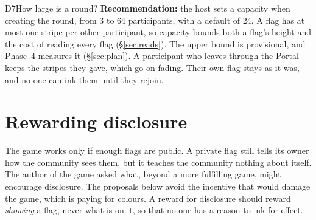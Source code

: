 \documentclass[11pt,a4paper]{article}
\begin{document}
\begin{decision}{D7}{How large is a round?}
\textbf{Recommendation:} the host sets a capacity when creating the round, from 3 to 64
participants, with a default of 24. A flag has at most one stripe per other participant, so
capacity bounds both a flag's height and the cost of reading every flag
(\S\ref{sec:reads}). The upper bound is provisional, and Phase~4 measures it
(\S\ref{sec:plan}). A participant who leaves through the Portal keeps the stripes they gave,
which go on fading. Their own flag stays as it was, and no one can ink them until they rejoin.
\end{decision}

\section{Rewarding disclosure}\label{sec:incentives}

The game works only if enough flags are public. A private flag still tells its owner how the
community sees them, but it teaches the community nothing about itself. The author of the game
asked what, beyond a more fulfilling game, might encourage disclosure. The proposals below avoid
the incentive that would damage the game, which is paying for colours. A reward for disclosure
should reward \emph{showing} a flag, never what is on it, so that no one has a reason to ink for
effect.
\end{document}
